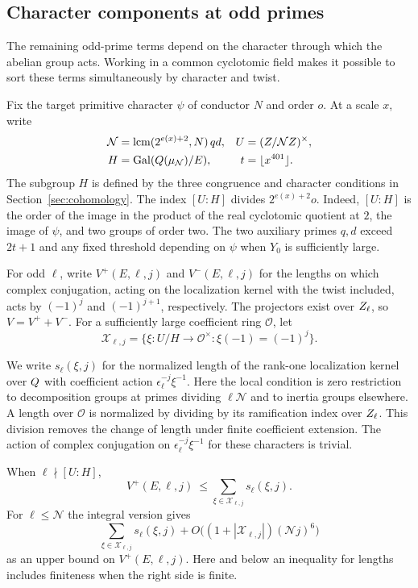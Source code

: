 \subsection{Character components at odd primes}\label{sec:odd-prime-cases}
\hypertarget{source-ordinary-odd-primes}{}

The remaining odd-prime terms depend on the character through which the abelian group acts. Working in a common cyclotomic field makes it possible to sort these terms simultaneously by character and twist.

Fix the target primitive character \(\psi\) of conductor \(N\)
and order \(o\). At a scale \(x\), write
\[
\begin{aligned}
 \mathcal N&=\operatorname{lcm}(2^{e(x)+2},N)\,qd,&
 U&=(Z/\mathcal NZ)^\times,\\
 H&=\operatorname{Gal}(Q(\mu_{\mathcal N})/E),&
 t&=\lfloor x^{401}\rfloor .
\end{aligned}
\]
The subgroup \(H\) is defined by the three congruence and character
conditions in Section~\ref{sec:cohomology}. The index \([U:H]\)
divides \(2^{e(x)+2}o\). Indeed, \([U:H]\) is the order of the
image in the product of the real cyclotomic quotient at \(2\),
the image of \(\psi\), and two groups of order two. The two auxiliary
primes \(q,d\) exceed \(2t+1\) and any fixed threshold depending on
\(\psi\) when \(Y_0\) is sufficiently large.

For odd \(\ell\), write \(V^{+}(E,\ell,j)\) and
\(V^{-}(E,\ell,j)\) for the lengths on which complex conjugation,
acting on the localization kernel with the twist included, acts
by \((-1)^j\) and \((-1)^{j+1}\), respectively. The projectors exist
over \(Z_\ell\), so \(V=V^++V^-\).
For a sufficiently large coefficient ring \(\mathcal O\), let
\[
 \mathcal X_{\ell,j}
  =\{\xi:U/H\longrightarrow\mathcal O^\times:
                     \xi(-1)=(-1)^j\}.
\]

We write \(s_\ell(\xi,j)\) for the normalized length of the
rank-one localization kernel over \(Q\) with coefficient action
\(\epsilon_\ell^{-j}\xi^{-1}\). Here the local condition is zero
restriction to decomposition groups at primes dividing \(\ell\mathcal N\)
and to inertia groups elsewhere. A length over \(\mathcal O\) is
normalized by dividing by its ramification index over \(Z_\ell\).
This division removes the change of length under finite coefficient
extension. The action of complex conjugation on
\(\epsilon_\ell^{-j}\xi^{-1}\) for these characters is trivial.

\begin{proposition}
When
\(\ell\nmid [U:H]\),
\[
 V^+(E,\ell,j)\ \le \sum_{\xi\in\mathcal X_{\ell,j}}s_\ell(\xi,j).
 \tag{P}\label{eq:local-odd-p}
\]
For \(\ell\le\mathcal N\) the integral version gives
\[
 \sum_{\xi\in\mathcal X_{\ell,j}}s_\ell(\xi,j)
     +O\bigl((1+|\mathcal X_{\ell,j}|)(\mathcal N j)^6\bigr)
 \tag{I}\label{eq:local-odd-i}
\]
as an upper bound on \(V^+(E,\ell,j)\). Here and below an
inequality for lengths includes finiteness when the right
side is finite.

\end{proposition}

